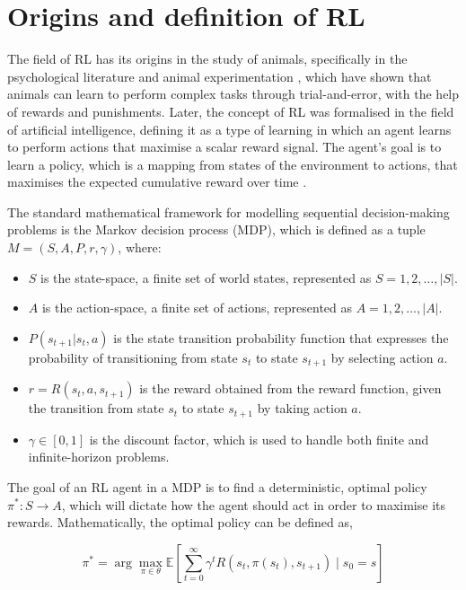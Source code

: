 \documentclass[a4paper,singleside,12pt]{report} %
\begin{document}
\section{Origins and definition of RL}\label{origins}

The field of RL has its origins in the study of animals, specifically in the psychological literature \cite{Rao2000ReinforcementLA} and animal experimentation \cite{Rescorla1988behavioral}, which have shown that animals can learn to perform complex tasks through trial-and-error, with the help of rewards and punishments. Later, the concept of RL was formalised in the field of artificial intelligence, defining it as a type of learning in which an agent learns to perform actions that maximise a scalar reward signal. The agent's goal is to learn a policy, which is a mapping from states of the environment to actions, that maximises the expected cumulative reward over time \cite{Rao2000ReinforcementLA}.

The standard mathematical framework for modelling sequential decision-making problems is the Markov decision process (MDP), which is defined as a tuple \(M = (S, A, P, r, \gamma)\), where:

\begin{itemize}
\item
  \(S\) is the state-space, a finite set of world states, represented as \(S = {1, 2, \dots, |S|}\).
\item
  \(A\) is the action-space, a finite set of actions, represented as \(A = {1, 2, \dots, |A|}\).
\item
  \(P(s_{t+1}|s_t, a)\) is the state transition probability function that expresses the probability of transitioning from state \(s_t\) to state \(s_{t+1}\) by selecting action \(a\).
\item
  \(r = R(s_t, a, s_{t+1})\) is the reward obtained from the reward function, given the transition from state \(s_t\) to state \(s_{t+1}\) by taking action
  \(a\).
\item
  \(\gamma \in [0, 1]\) is the discount factor, which is used to handle both finite and infinite-horizon problems.
\end{itemize}

The goal of an RL agent in a MDP is to find a deterministic, optimal policy \(\pi^*: S \rightarrow A\), which will dictate how the agent should act in order to maximise its rewards. Mathematically, the optimal policy can be defined as,

\begin{equation}
\pi^* = \arg \max_{\pi \in \theta} \mathbb{E}[\sum_{t=0}^{\infty} \gamma^t R(s_t, \pi(s_t), s_{t+1}) \mid s_0 = s]
\end{equation}
\end{document}
